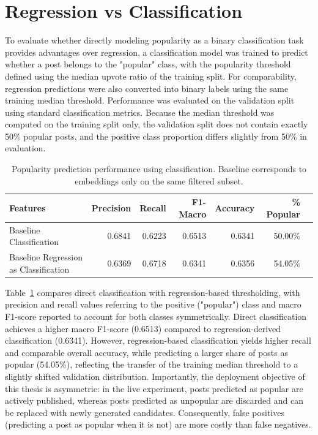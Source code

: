 \section{Regression vs Classification}

To evaluate whether directly modeling popularity as a binary classification task provides advantages over regression, a classification model was trained to predict whether a post belongs to the "popular" class, with the popularity threshold defined using the median upvote ratio of the training split. For comparability, regression predictions were also converted into binary labels using the same training median threshold. Performance was evaluated on the validation split using standard classification metrics. Because the median threshold was computed on the training split only, the validation split does not contain exactly 50\% popular posts, and the positive class proportion differs slightly from 50\% in evaluation.

\begin{table}[htbp] 
    \centering 
    \caption{Popularity prediction performance using classification. Baseline corresponds to embeddings only on the same filtered subset.} 
    \label{tab:classification} 
    \begin{tabular}{lrrrrrr} 
        \toprule Features & Precision & Recall & F1-Macro & Accuracy & \% Popular \\ \midrule Baseline Classification & 0.6841 & 0.6223 & 0.6513 & 0.6341 & 50.00\% \\ Baseline Regression as Classification & 0.6369 & 0.6718 & 0.6341 & 0.6356 & 54.05\% \\ 
        \bottomrule 
    \end{tabular} 
\end{table}

Table~\ref{tab:classification} compares direct classification with regression-based thresholding, with precision and recall values referring to the positive ("popular") class and macro F1-score reported to account for both classes symmetrically. Direct classification achieves a higher macro F1-score (0.6513) compared to regression-derived classification (0.6341). However, regression-based classification yields higher recall and comparable overall accuracy, while predicting a larger share of posts as popular (54.05\%), reflecting the transfer of the training median threshold to a slightly shifted validation distribution. Importantly, the deployment objective of this thesis is asymmetric: in the live experiment, posts predicted as popular are actively published, whereas posts predicted as unpopular are discarded and can be replaced with newly generated candidates. Consequently, false positives (predicting a post as popular when it is not) are more costly than false negatives.

